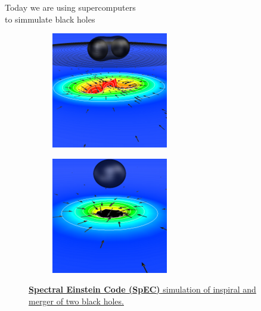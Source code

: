 \documentclass[xcolor={dvipsnames}]{beamer}
\begin{document}
\begin{frame}{Today we are using supercomputers\\ to simmulate black holes}{}
\begin{figure}[H]
\begin{subfigure}{.24\textwidth}
\end{subfigure}
\begin{subfigure}{.24\textwidth}
	\centering
	\includegraphics[width=\linewidth]{spec03}
\end{subfigure}
\begin{subfigure}{.24\textwidth}
	\centering
	\includegraphics[width=\linewidth]{spec04}
\end{subfigure}
\label{fig:spec}
\caption*{\href{https://www.black-holes.org/SpEC.html}{\textbf{Spectral Einstein Code (SpEC)} simulation of inspiral and merger of two black holes.}}
\end{figure}
\end{frame}
\end{document}
